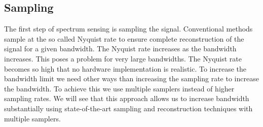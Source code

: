 \documentclass[a4paper, openany, oneside]{memoir}
\begin{document}
\subsection{Sampling}
The first step of spectrum sensing is sampling the signal. Conventional methods sample at the so called Nyquist rate  to ensure complete reconstruction of the signal for a given bandwidth. The Nyquist rate increases as the bandwidth increases. This poses a problem for very large bandwidths. The Nyquist rate becomes so high that no hardware implementation is realistic. To increase the bandwidth limit we need other ways than increasing the sampling rate to increase the bandwidth. To achieve this we use multiple samplers instead of higher sampling rates. We will see that this approach allows us to increase bandwidth substantially using state-of-the-art sampling and reconstruction techniques with multiple samplers.
\end{document}

